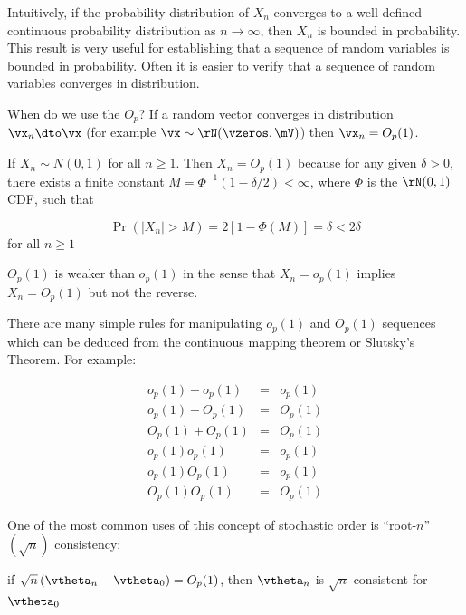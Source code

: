 Intuitively, if the probability distribution of $X_n$ converges to a well-defined continuous probability distribution as $n\to \infty$, then $X_n$ is bounded in probability. This result is very useful for establishing that a sequence of random variables is bounded in probability. Often it is easier to verify that a sequence of random variables converges in distribution. 

When do we use the $O_p$?  If a random vector converges in distribution $\vx_n \dto \vx$ (for example $\vx\sim \rN(\vzeros, \mV)$) then $\vx_n = O_p(1)$. 

\begin{example}
  If $X_n\sim N(0,1)$ for all $n\geq 1$. Then $X_n = O_p(1)$ because for any given $\delta > 0$, there exists a finite constant $M = \Phi^{-1}(1 - \delta/2)<\infty$, where $\Phi$ is the $\rN(0, 1)$ CDF, such that
  
  \begin{equation*}
    \Pr(\left|X_n\right| > M) = 2\left[1 - \Phi(M)\right] = \delta < 2\delta
  \end{equation*}
  for all $n \geq 1$
\end{example}

$O_p(1)$ is weaker than $o_p(1)$ in the sense that $X_n = o_p(1)$ implies $X_n = O_p(1)$ but not the reverse.

There are many simple rules for manipulating $o_p(1)$ and $O_p(1)$ sequences which can be deduced from the continuous mapping theorem or Slutsky's Theorem. For example:

\begin{eqnarray*}
 o_p(1) + o_p(1) & = & o_p(1) \\
 o_p(1) + O_p(1) & = & O_p(1) \\
 O_p(1) + O_p(1) & = & O_p(1) \\
 o_p(1) o_p(1)   & = & o_p(1) \\
 o_p(1) O_p(1)   & = & o_p(1) \\
 O_p(1) O_p(1)   & = & O_p(1)
\end{eqnarray*}

One of the most common uses of this concept of stochastic order is ``root-$n$'' $(\sqrt{n})$ consistency:

\begin{definition}
		if $\sqrt{n}\left(\vtheta_n - \vtheta_0\right)= O_p(1)$, then $\vtheta_n$ is $\sqrt{n}$ consistent for $\vtheta_0$
\end{definition}

